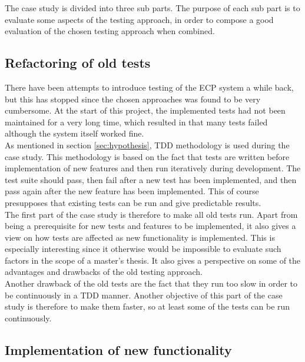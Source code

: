
The case study is divided into three sub parts. The purpose of each
sub part is to evaluate some aspects of the testing approach, in order
to compose a good evaluation of the chosen testing approach when
combined.\\


\subsection{Refactoring of old tests}
\label{sec:casestudy_1}

There have been attempts to introduce testing of the ECP system a while
back, but this has stopped since the chosen approaches was found to be
very cumbersome. At the start of this project, the implemented tests had
not been maintained for a very long time, which resulted in that many
tests failed although the system itself worked fine.\\

As mentioned in section \ref{sec:hypothesis}, TDD methodology is
used during the case study. This methodology is based on the fact that
tests are written before implementation of new features and then run
iteratively during development. The test suite should pass, then fail
after a new test has been implemented, and then pass again after the new
feature has been implemented. This of course presupposes that existing
tests can be run and give predictable results.\\

The first part of the case study is therefore to make all old tests run.
Apart from being a prerequisite for new tests and features to be
implemented, it also gives a view on how tests are affected as new
functionality is implemented. This is especially interesting since it
otherwise would be impossible to evaluate such factors in the scope of a
master's thesis. It also gives a perspective on some of the advantages
and drawbacks of the old testing approach.\\

Another drawback of the old tests are the fact that they run too slow in
order to be continuously in a TDD manner. Another objective of this part
of the case study is therefore to make them faster, so at least some of
the tests can be run continuously.\\


\subsection{Implementation of new functionality}
\label{sec:casestudy_2}

